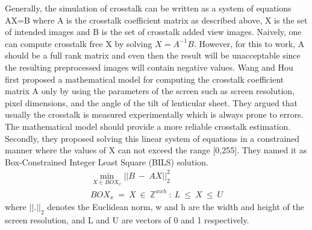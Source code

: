 Generally, the simulation of crosstalk can be written as a system of equations AX=B where A is the crosstalk coefficient matrix as described above, X is the set of intended images and B is the set of crosstalk added view images. Naively, one can compute crosstalk free X by solving $X=A^{-1}B$. However, for this to work, A should be a full rank matrix and even then the result will be unacceptable since the resulting preprocessed images will contain negative values. Wang and Hou \cite{wang2014improved} first proposed a mathematical model for computing the crosstalk coefficient matrix A only by using the parameters of the screen such as screen resolution, pixel dimensions, and the angle of the tilt of lenticular sheet. They argued that usually the crosstalk is measured experimentally which is always prone to errors. The mathematical model should provide a more reliable crosstalk estimation. Secondly, they proposed solving this linear system of equations in a constrained manner where the values of X can not exceed the range [0,255]. They named it as Box-Constrained Integer Least Square (BILS) solution.
\begin{equation}
\begin{aligned}
\underset{X \in BOX_x}{\operatorname{min}}||B\: -\: AX||_2^2 \\
BOX_x\: = \: {X\: \in \: \mathbb{Z}^{wxh} \: : \: L\: \leq \: X\: \leq\: U }
\end{aligned}
\label{eq:bils}
\end{equation}
where $||.||_2$ denotes the Euclidean norm, w and h are the width and height of the screen resolution, and L and U are vectors of 0 and 1 respectively.
